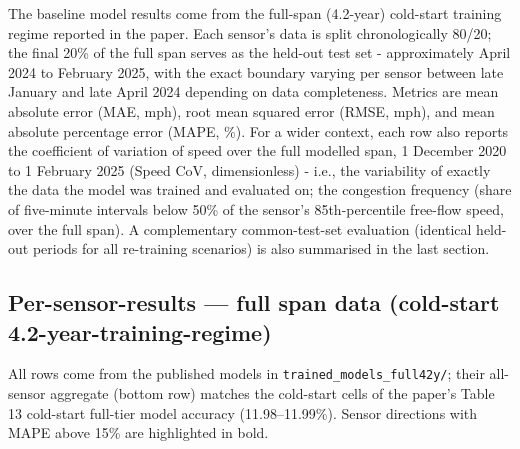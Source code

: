\documentclass[
  10pt, ]{article}
\begin{document}
The baseline model results come from the full-span (4.2-year) cold-start training regime reported in the paper. Each sensor's data is split chronologically 80/20; the final 20\% of the full span serves as the held-out test set - approximately April 2024 to February 2025, with the exact boundary varying per sensor between late January and late April 2024 depending on data completeness. Metrics are mean absolute error (MAE, mph), root mean squared error (RMSE, mph), and mean absolute percentage error (MAPE, \%). For a wider context, each row also reports the coefficient of variation of speed over the full modelled span, 1 December 2020 to 1 February 2025 (Speed CoV, dimensionless) - i.e., the variability of exactly the data the model was trained and evaluated on; the congestion frequency (share of five-minute intervals below 50\% of the sensor's 85th-percentile free-flow speed, over the full span). A complementary common-test-set evaluation (identical held-out periods for all re-training scenarios) is also summarised in the last section.

\hypertarget{per-sensor-results-full span data (cold-start 4.2-year-training-regime)}{%
\subsection{Per-sensor-results --- full span data (cold-start 4.2-year-training-regime)}\label{per-sensor-results-4.2-year-training-regime}}

All rows come from the published models in
\texttt{trained\_models\_full42y/}; their
all-sensor aggregate (bottom row) matches the cold-start cells of the paper's Table 13 cold-start full-tier model accuracy (11.98--11.99\%). Sensor directions with MAPE above 15\% are highlighted in bold.
\end{document}
